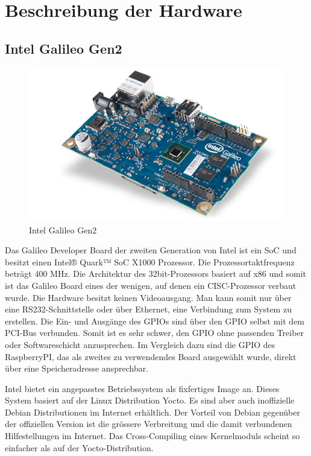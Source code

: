 \section{Beschreibung der Hardware}
\label{beschreibung_hardware}
\subsection{Intel Galileo Gen2}

\begin{figure}
\centering
\includegraphics[scale=0.5]{images/iot_galileo.png}
\caption{Intel Galileo Gen2\cite{intel_galileo_image}}
\label{fig:Intel Galileo Gen2}
\end{figure}

Das Galileo Developer Board\cite{intel_datasheet_galileo} der zweiten Generation von
Intel ist ein SoC und besitzt einen Intel® Quark™ SoC X1000 Prozessor. Die Prozessortaktfrequenz beträgt 400 MHz. Die Architektur des 32bit-Prozessors basiert auf x86\cite{intel_datasheet} und somit ist das Galileo
Board eines der wenigen, auf denen ein CISC-Prozessor verbaut wurde. Die Hardware
besitzt keinen Videoausgang. Man kann somit nur über eine RS232-Schnittstelle oder über Ethernet,
eine Verbindung zum System zu erstellen. Die Ein- und Ausgänge des GPIOs sind über den GPIO selbst mit dem
PCI-Bus verbunden. Somit ist es sehr schwer, den GPIO ohne passenden Treiber oder
Softwareschicht anzusprechen. Im Vergleich dazu sind die GPIO des RaspberryPI, das als zweites zu verwendendes Board ausgewählt wurde, direkt über eine Speicheradresse ansprechbar.
\par
Intel bietet ein angepasstes Betriebssystem als fixfertiges Image an. Dieses System basiert auf
der Linux Distribution Yocto. Es sind aber auch inoffizielle Debian Distributionen im
Internet erhältlich. Der Vorteil von Debian gegenüber der offiziellen Version ist die
grössere Verbreitung und die damit verbundenen Hilfestellungen im Internet. Das Cross-Compiling eines Kernelmoduls scheint so einfacher als auf der Yocto-Distribution.


